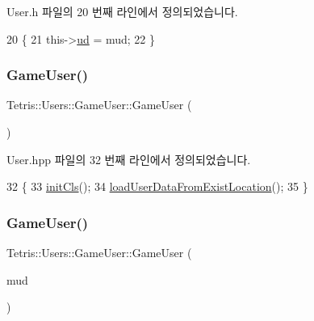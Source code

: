 User.\+h 파일의 20 번째 라인에서 정의되었습니다.


\begin{DoxyCode}
20                                        \{
21                     this->\hyperlink{class_tetris_1_1_users_1_1_game_user_ac1f44d636258caa01f3041408d235289}{ud} = mud;
22                 \}
\end{DoxyCode}
\mbox{\label{class_tetris_1_1_users_1_1_game_user_af9d7bed8e019ca4348995337ea7339b7}} 
\subsubsection{\texorpdfstring{Game\+User()}{GameUser()}\hspace{0.1cm}{\footnotesize\ttfamily [3/4]}}
{\footnotesize\ttfamily Tetris\+::\+Users\+::\+Game\+User\+::\+Game\+User (\begin{DoxyParamCaption}{ }\end{DoxyParamCaption})\hspace{0.3cm}{\ttfamily [inline]}}



User.\+hpp 파일의 32 번째 라인에서 정의되었습니다.


\begin{DoxyCode}
32                           \{
33                     \hyperlink{class_tetris_1_1_users_1_1_game_user_a8ec8ca43d0c6d0dc2c2e049ae1b4d316}{initCls}();
34                     \hyperlink{class_tetris_1_1_users_1_1_game_user_a730bd78525a4802685b53c67b38eca0c}{loadUserDataFromExistLocation}();
35                 \}
\end{DoxyCode}
\mbox{\label{class_tetris_1_1_users_1_1_game_user_a61819671f799d3d6cb2d89e99ffd1714}} 
\subsubsection{\texorpdfstring{Game\+User()}{GameUser()}\hspace{0.1cm}{\footnotesize\ttfamily [4/4]}}
{\footnotesize\ttfamily Tetris\+::\+Users\+::\+Game\+User\+::\+Game\+User (\begin{DoxyParamCaption}\item[{\hyperlink{class_tetris_1_1_users_1_1_user_data}{User\+Data} $\ast$}]{mud }\end{DoxyParamCaption})\hspace{0.3cm}{\ttfamily [inline]}}



